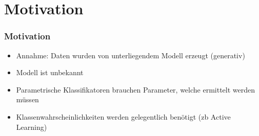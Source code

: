 \section{Motivation}

\begin{frame}
	\frametitle{Motivation}
	\begin{itemize}
		\item Annahme: Daten wurden von unterliegendem Modell erzeugt (generativ)
		\item Modell ist unbekannt
		\item Parametrische Klassifikatoren brauchen Parameter, welche ermittelt werden m\"ussen
		\item Klassenwahrscheinlichkeiten werden gelegentlich ben\"otigt (zb Active Learning)
	\end{itemize}
\end{frame}
